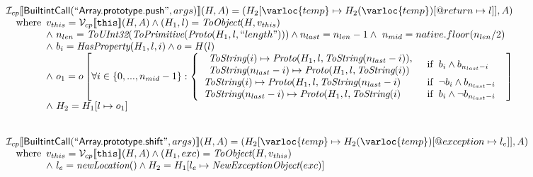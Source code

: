 \[\begin{array}{l}
\I _{cp}\lbr \SF{BuiltintCall}(``\SF{Array.prototype.push}",args)\rbr(H,A)
 = (H_2[\varloc{temp}\mapsto H_2(\varloc{temp})[\varprop{return}\mapsto l]], A) \\
\quad\wherec{
  v_{this} = \V _{cp}\lbr \TT{this}\rbr (H,A) \land (H_1,l) = \hf{ToObject}(H,v_{this})\\
  \land\ n_{len} = \hf{ToUInt32}(\hf{ToPrimitive}(\hf{Proto}(H_1, l, ``length")))
  \land n_{last} = n_{len}-1 \land\ n_{mid} = native.floor(n_{len}/2)\\
  \land\ b_i = \hf{HasProperty}(H_1, l, i) \land o = H(l)\\
  \land\ o_1 = o\left[\forall i \in \{0,...,n_{mid}-1\}: \left\{\begin{array}{ll}
    \begin{array}{l}
      \hf{ToString}(i) \mapsto \hf{Proto}(H_1, l, \hf{ToString}(n_{last} - i)),\\
      \hf{ToString}(n_{last} - i) \mapsto \hf{Proto}(H_1, l,  \hf{ToString}(i))\\
    \end{array}
    & \ifc{b_i \land b_{n_{last} - i} }\\
    \hf{ToString}(i) \mapsto \hf{Proto}(H_1, l, \hf{ToString}(n_{last} - i) 
    & \ifc{\neg b_i \land b_{n_{last} - i} }\\
    \hf{ToString}(n_{last} - i) \mapsto \hf{Proto}(H_1, l,  \hf{ToString}(i)
    & \ifc{b_i \land \neg b_{n_{last} - i} }\\
  \end{array}\right.\right]\\
  \land\ H_2 = H_1[ l \mapsto o_1]\\
  }\\
\\\\



\I _{cp}\lbr \SF{BuiltintCall}(``\SF{Array.prototype.shift}",args)\rbr(H,A)
 = (H_2[\varloc{temp}\mapsto H_2(\varloc{temp})[\varprop{exception}\mapsto l_e]], A) \\
\quad\wherec{
  v_{this} = \V _{cp}\lbr \TT{this}\rbr (H,A) \land (H_1,exc) = \hf{ToObject}(H,v_{this})\\
  \land\ l_e = \hf{newLocation}() \land H_2=H_1[l_e\mapsto\hf{NewExceptionObject}(exc)] 
  }\\
  

\end{array}\]
